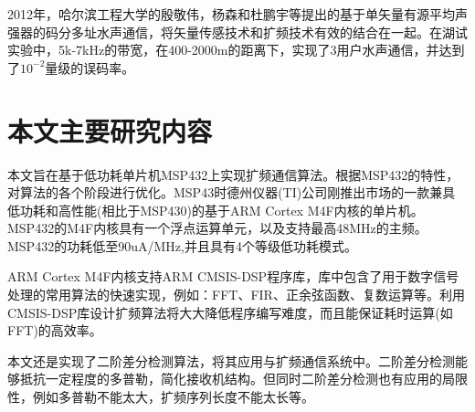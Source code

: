 2012年，哈尔滨工程大学的殷敬伟，杨森和杜鹏宇等提出的基于单矢量有源平均声强器的码分多址水声通信，将矢量传感技术和扩频技术有效的结合在一起。在湖试实验中，5k-7kHz的带宽，在400-2000m的距离下，实现了3用户水声通信，并达到了$10^{-2}$量级的误码率。

\section{本文主要研究内容}
本文旨在基于低功耗单片机MSP432上实现扩频通信算法。根据MSP432的特性，对算法的各个阶段进行优化。MSP43时德州仪器(TI)公司刚推出市场的一款兼具低功耗和高性能(相比于MSP430)的基于ARM Cortex M4F内核的单片机。MSP432的M4F内核具有一个浮点运算单元，以及支持最高48MHz的主频。MSP432的功耗低至90uA/MHz,并且具有4个等级低功耗模式。

ARM Cortex M4F内核支持ARM CMSIS-DSP程序库，库中包含了用于数字信号处理的常用算法的快速实现，例如：FFT、FIR、正余弦函数、复数运算等。利用CMSIS-DSP库设计扩频算法将大大降低程序编写难度，而且能保证耗时运算(如FFT)的高效率。

本文还是实现了二阶差分检测算法，将其应用与扩频通信系统中。二阶差分检测能够抵抗一定程度的多普勒，简化接收机结构。但同时二阶差分检测也有应用的局限性，例如多普勒不能太大，扩频序列长度不能太长等。

